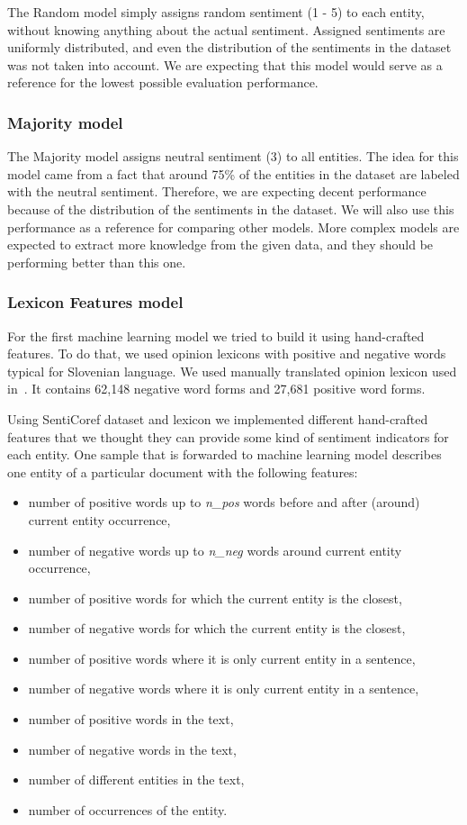 \documentclass[11pt,a4paper]{article}
\begin{document}
The Random model simply assigns random sentiment (1 - 5) to each entity, without knowing anything about the actual sentiment.
Assigned sentiments are uniformly distributed, and even the distribution of the sentiments in the dataset was not taken into account.
We are expecting that this model would serve as a reference for the lowest possible evaluation performance.

\subsubsection{Majority model}

The Majority model assigns neutral sentiment (3) to all entities.
The idea for this model came from a fact that around 75\% of the entities in the dataset are labeled with the neutral sentiment.
Therefore, we are expecting decent performance because of the distribution of the sentiments in the dataset.
We will also use this performance as a reference for comparing other models.
More complex models are expected to extract more knowledge from the given data, and they should be performing better than this one.

\subsubsection{Lexicon Features model}

For the first machine learning model we tried to build it using hand-crafted features. 
To do that, we used opinion lexicons with positive and negative words typical for Slovenian language.
We used manually translated opinion lexicon used in~\cite{kaduncanaliza}.
It contains 62,148 negative word forms and 27,681 positive word forms.


Using SentiCoref dataset and lexicon we implemented different hand-crafted features that we thought they can provide some kind of sentiment indicators for each entity.
One sample that is forwarded to machine learning model describes one entity of a particular document with the following features:
\begin{itemize}
    \item number of positive words up to \emph{n\_pos} words before and after (around) current entity occurrence,
    \item number of negative words up to \emph{n\_neg} words around current entity occurrence,
    \item number of positive words for which the current entity is the closest,
    \item number of negative words for which the current entity is the closest,
    \item number of positive words where it is only current entity in a sentence,
    \item number of negative words where it is only current entity in a sentence,
    \item number of positive words in the text,
    \item number of negative words in the text,
    \item number of different entities in the text,
    \item number of occurrences of the entity.
\end{itemize}
\end{document}
